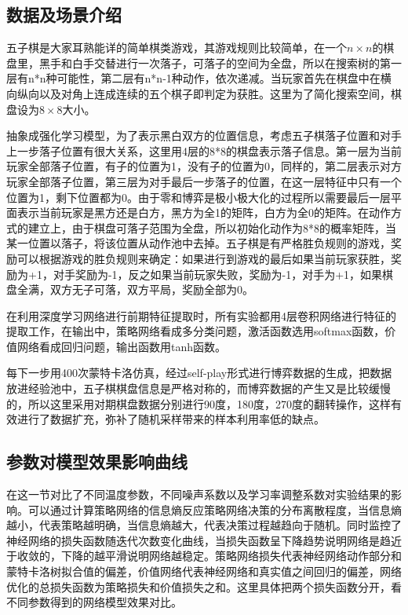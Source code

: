 \subsection{数据及场景介绍}
五子棋是大家耳熟能详的简单棋类游戏，其游戏规则比较简单，在一个$n \times n$的棋盘里，黑手和白手交替进行一次落子，可落子的空间为全盘，所以在搜索树的第一层有n*n种可能性，第二层有n*n-1种动作，依次递减。当玩家首先在棋盘中在横向纵向以及对角上连成连续的五个棋子即判定为获胜。这里为了简化搜索空间，棋盘设为$8 \times 8$大小。

抽象成强化学习模型，为了表示黑白双方的位置信息，考虑五子棋落子位置和对手上一步落子位置有很大关系，这里用4层的8*8的棋盘表示落子信息。第一层为当前玩家全部落子位置，有子的位置为1，没有子的位置为0，同样的，第二层表示对方玩家全部落子位置，第三层为对手最后一步落子的位置，在这一层特征中只有一个位置为1，剩下位置都为0。由于零和博弈是极小极大化的过程所以需要最后一层平面表示当前玩家是黑方还是白方，黑方为全1的矩阵，白方为全0的矩阵。在动作方式的建立上，由于棋盘可落子范围为全盘，所以初始化动作为8*8的概率矩阵，当某一位置以落子，将该位置从动作池中去掉。五子棋是有严格胜负规则的游戏，奖励可以根据游戏的胜负规则来确定：如果进行到游戏的最后如果当前玩家获胜，奖励为+1，对手奖励为-1，反之如果当前玩家失败，奖励为-1，对手为+1，如果棋盘全满，双方无子可落，双方平局，奖励全部为0。

在利用深度学习网络进行前期特征提取时，所有实验都用4层卷积网络进行特征的提取工作，在输出中，策略网络看成多分类问题，激活函数选用softmax函数，价值网络看成回归问题，输出函数用tanh函数。

每下一步用400次蒙特卡洛仿真，经过self-play形式进行博弈数据的生成，把数据放进经验池中，五子棋棋盘信息是严格对称的，而博弈数据的产生又是比较缓慢的，所以这里采用对期棋盘数据分别进行90度，180度，270度的翻转操作，这样有效进行了数据扩充，弥补了随机采样带来的样本利用率低的缺点。

\subsection{参数对模型效果影响曲线}
在这一节对比了不同温度参数，不同噪声系数以及学习率调整系数对实验结果的影响。可以通过计算策略网络的信息熵反应策略网络决策的分布离散程度，当信息熵越小，代表策略越明确，当信息熵越大，代表决策过程越趋向于随机。同时监控了神经网络的损失函数随迭代次数变化曲线，当损失函数呈下降趋势说明网络是趋近于收敛的，下降的越平滑说明网络越稳定。策略网络损失代表神经网络动作部分和蒙特卡洛树拟合值的偏差，价值网络代表神经网络和真实值之间回归的偏差，网络优化的总损失函数为策略损失和价值损失之和。这里具体把两个损失函数分开，看不同参数得到的网络模型效果对比。

